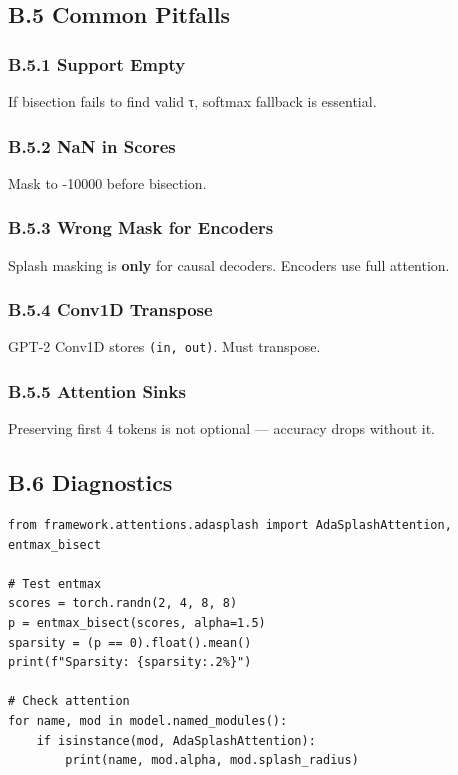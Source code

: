 \subsection{B.5 Common Pitfalls}

\subsubsection{B.5.1 Support Empty}

If bisection fails to find valid τ, softmax fallback is essential.

\subsubsection{B.5.2 NaN in Scores}

Mask to -10000 before bisection.

\subsubsection{B.5.3 Wrong Mask for Encoders}

Splash masking is \textbf{only} for causal decoders. Encoders use full attention.

\subsubsection{B.5.4 Conv1D Transpose}

GPT-2 Conv1D stores \texttt{(in, out)}. Must transpose.

\subsubsection{B.5.5 Attention Sinks}

Preserving first 4 tokens is not optional — accuracy drops without it.

\subsection{B.6 Diagnostics}

\begin{lstlisting}
from framework.attentions.adasplash import AdaSplashAttention, entmax_bisect

# Test entmax
scores = torch.randn(2, 4, 8, 8)
p = entmax_bisect(scores, alpha=1.5)
sparsity = (p == 0).float().mean()
print(f"Sparsity: {sparsity:.2%}")

# Check attention
for name, mod in model.named_modules():
    if isinstance(mod, AdaSplashAttention):
        print(name, mod.alpha, mod.splash_radius)
\end{lstlisting}